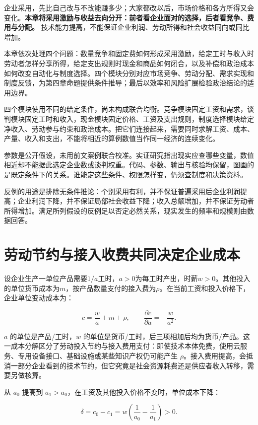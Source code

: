 \documentclass[UTF8,fontset=windows,12pt,a4paper,oneside,openany]{ctexbook}
\begin{document}
企业采用，先比自己改与不改能赚多少；大家都改以后，市场价格和各方所得又会变化。\textbf{本章将采用激励与收益去向分开：前者看企业面对的选择，后者看竞争、费用与分配。} 技术能力提高，不能保证企业利润、劳动所得和社会收益同向或同比增加。

本章依次处理四个问题：数量竞争和固定费如何形成采用激励，给定工时与收入时劳动者怎样分享所得，给定支出规则时现金和商品如何闭合，以及补偿和政治成本如何改变自动化与制度选择。四个模块分别对应市场竞争、劳动分配、需求实现和制度反馈，为第四章命题提供条件推导；最后以效率和风险扩展检验政治结论的适用边界。

四个模块使用不同的给定条件，尚未构成联合均衡。竞争模块固定工资和需求，谈判模块固定工时和收入，现金模块固定价格、工资及支出规则，制度选择模块给定净收入、劳动参与约束和政治成本。把它们连接起来，需要同时求解工资、成本、产量、收入和支出，不能将相近的算例数值当作同一经济的连续变化。

参数是公开假设，未用前文案例联合校准。实证研究指出现实应查哪些变量，数值相近却不能据此选定企业数或谈判权重。代码、参数、输出与核验均保留，图画的是既定条件下的关系。谁能定这些条件、权限怎样变，仍须查制度和决策资料。

反例的用途是排除无条件推论：个别采用有利，并不保证普遍采用后企业利润提高；企业利润下降，并不保证局部社会收益下降；收入总额增加，并不保证劳动者所得增加。满足所列假设的反例足以否定必然关系，现实发生的频率和规模则由数据回答。

\section{劳动节约与接入收费共同决定企业成本}

设企业生产一单位产品需要$1/a$工时，$a>0$为每工时产出，时薪$w>0$。其他投入的单位货币成本为$m$，按产品数量支付的接入费为$\rho$。在当前工资和投入价格下，企业单位变动成本为：

\[
c=\frac{w}{a}+m+\rho,\qquad
\frac{\partial c}{\partial a}=-\frac{w}{a^2}.
\tag{14-1}
\]

\(a\) 的单位是产品/工时，\(w\) 的单位是货币/工时，后三项相加后均为货币/产品。这一成本分解区分了劳动投入节约与接入费用支付：即使技术本体免费，使用云服务、专用设备接口、基础设施或某些知识产权仍可能产生 \(\rho\)。接入费用提高，会抵消一部分企业看到的技术节约，但它究竟是社会资源耗费还是供应者收入转移，需要另做核算。

从 \(a_0\) 提高到 \(a_1>a_0\)，在工资及其他投入价格不变时，单位成本下降：

\[
\delta=c_0-c_1=w\left(\frac1{a_0}-\frac1{a_1}\right)>0.
\tag{14-2}
\]
\end{document}
